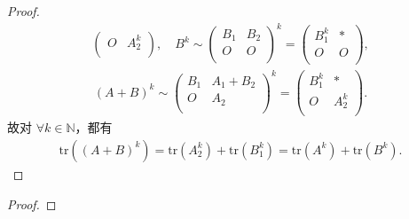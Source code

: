 \documentclass[../../main.tex]{subfiles}
\begin{document}
\begin{proof}
\begin{align*}
\begin{pmatrix}
O&		A_{2}^{k}\\
\end{pmatrix}, \quad B^k\sim \begin{pmatrix}
B_1&		B_2\\
O&		O\\
\end{pmatrix} ^k=\begin{pmatrix}
B_{1}^{k}&		*\\
O&		O\\
\end{pmatrix},
\end{align*}
\begin{align*}
\left( A+B \right) ^k\sim \begin{pmatrix}
B_1&		A_1+B_2\\
O&		A_2\\
\end{pmatrix} ^k=\begin{pmatrix}
B_{1}^{k}&		*\\
O&		A_{2}^{k}\\
\end{pmatrix}.
\end{align*}
故对 $\forall k\in \mathbb{N}$，都有
\begin{align*}
\mathrm{tr}\left( \left( A+B \right) ^k \right) =\mathrm{tr}\left( A_{2}^{k} \right) +\mathrm{tr}\left( B_{1}^{k} \right) =\mathrm{tr}\left( A^k \right) +\mathrm{tr}\left( B^k \right) .
\end{align*}
\end{proof}

\begin{example}

\end{example}
\begin{proof}

\end{proof}
\end{document}

